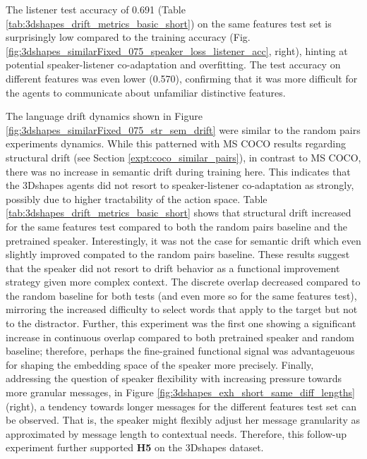 The listener test accuracy of 0.691 (Table \ref{tab:3dshapes_drift_metrics_basic_short}) on the same features test set is surprisingly low compared to the training accuracy (Fig. \ref{fig:3dshapes_similarFixed_075_speaker_loss_listener_acc}, right), hinting at potential speaker-listener co-adaptation and overfitting. The test accuracy on different features was even lower (0.570), confirming that it was more difficult for the agents to communicate about unfamiliar distinctive features. 

The language drift dynamics shown in Figure \ref{fig:3dshapes_similarFixed_075_str_sem_drift} were similar to the random pairs experiments dynamics. While this patterned with MS COCO results regarding structural drift (see Section \ref{expt:coco_similar_pairs}), in contrast to MS COCO, there was no increase in semantic drift during training here. This indicates that the 3Dshapes agents did not resort to speaker-listener co-adaptation as strongly, possibly due to higher tractability of the action space.
Table \ref{tab:3dshapes_drift_metrics_basic_short} shows that structural drift increased for the same features test compared to both the random pairs baseline and the pretrained speaker. Interestingly, it was not the case for semantic drift which even slightly improved compated to the random pairs baseline. These results suggest that the speaker did not resort to drift behavior as a functional improvement strategy given more complex context. The discrete overlap decreased compared to the random baseline for both tests (and even more so for the same features test), mirroring the increased difficulty to select words that apply to the target but not to the distractor. Further, this experiment was the first one showing a significant increase in continuous overlap compared to both pretrained speaker and random baseline; therefore, perhaps the fine-grained functional signal was advantageuous for shaping the embedding space of the speaker more precisely. Finally, addressing the question of speaker flexibility with increasing pressure towards more granular messages, in Figure \ref{fig:3dshapes_exh_short_same_diff_lengths} (right), a tendency towards longer messages for the different features test set can be observed. That is, the speaker might flexibly adjust her message granularity as approximated by message length to contextual needs. %
Therefore, this follow-up experiment further supported \textbf{H5} on the 3Dshapes dataset.


